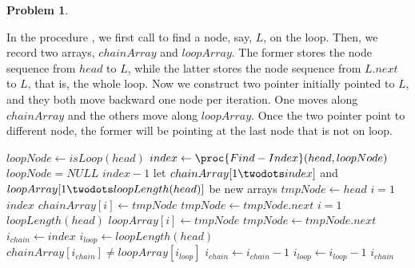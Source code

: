 \documentclass[12pt,a4paper]{report}
\newcommand{\get}{\leftarrow}
\theoremstyle{definition}
\newtheorem{problem}{\textbf{Problem}}
\theoremstyle{definition}
\begin{document}
\begin{problem}
\begin{enumerate}[label=\arabic*.]
\begin{enumerate}[label=\alph*.]
\begin{framed}
\newpage
In the procedure , we first call  to find a node, say, $L$, on the loop. Then, we record two arrays, $chainArray$ and $loopArray$. The former stores the node sequence from $head$ to $L$, while the latter stores the node sequence from $L.next$ to $L$, that is, the whole loop. Now we construct two pointer initially pointed to $L$, and they both move backward one node per iteration. One moves along $chainArray$ and the others move along $loopArray$. Once the two pointer point to different node, the former will be pointing at the last node that is not on loop.

\begin{codebox}
\li $loopNode\get isLoop(head)$
\li $index\get \proc{Find-Index}(head, loopNode)$
\li \If $loopNode=NULL$ \Then
\li     \Return $index-1$
    \End
\li let $chainArray[1\twodots index]$ and $loopArray[1\twodots loopLength(head)]$ be new arrays
\li $tmpNode\get head$
\li \For $i=1$ \To $index$ \Do
\li     $chainArray[i]\get tmpNode$
\li     $tmpNode\get tmpNode.next$
    \End
\li \For $i=1$ \To $loopLength(head)$ \Do
\li     $loopArray[i]\get tmpNode$
\li     $tmpNode\get tmpNode.next$
    \End
\li $i_{chain}\get index$
\li $i_{loop}\get loopLength(head)$
\li \While $chainArray[i_{chain}]\neq loopArray[i_{loop}]$\Do
\li     $i_{chain}\get i_{chain}-1$
\li     $i_{loop}\get i_{loop}-1$
    \End
\li \Return $i_{chain}$
\end{codebox}
\end{framed}
    \end{enumerate}

\end{enumerate}
\end{problem}

\newpage
\end{document}

